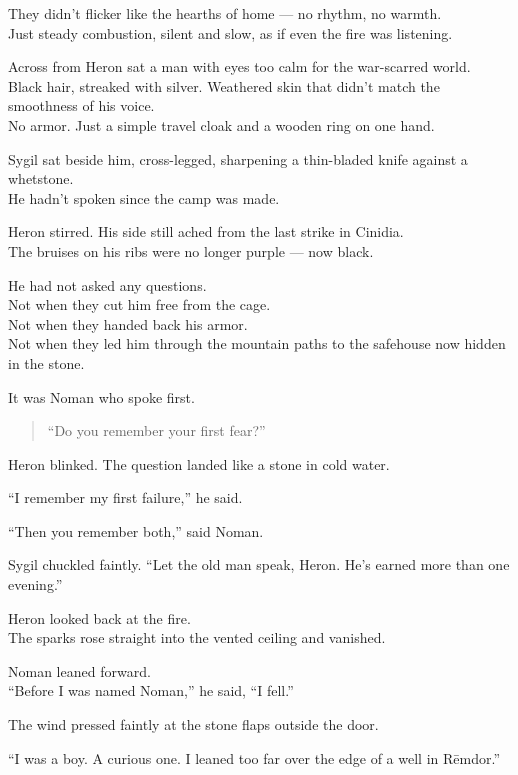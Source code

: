 \documentclass[12pt]{article}
\begin{document}
They didn’t flicker like the hearths of home — no rhythm, no warmth.\\
Just steady combustion, silent and slow, as if even the fire was listening.

Across from Heron sat a man with eyes too calm for the war-scarred world.\\
Black hair, streaked with silver. Weathered skin that didn’t match the smoothness of his voice.\\
No armor. Just a simple travel cloak and a wooden ring on one hand.

Sygil sat beside him, cross-legged, sharpening a thin-bladed knife against a whetstone.\\
He hadn’t spoken since the camp was made.

Heron stirred. His side still ached from the last strike in Cinidia.\\
The bruises on his ribs were no longer purple — now black.

He had not asked any questions.\\
Not when they cut him free from the cage.\\
Not when they handed back his armor.\\
Not when they led him through the mountain paths to the safehouse now hidden in the stone.

It was Noman who spoke first.

\begin{quote}
“Do you remember your first fear?” 
\end{quote}

Heron blinked. The question landed like a stone in cold water.

“I remember my first failure,” he said.

“Then you remember both,” said Noman.

\vspace{1em}

Sygil chuckled faintly. “Let the old man speak, Heron. He’s earned more than one evening.”

Heron looked back at the fire.\\
The sparks rose straight into the vented ceiling and vanished.

Noman leaned forward.\\
“Before I was named Noman,” he said, “I fell.”

The wind pressed faintly at the stone flaps outside the door.

“I was a boy. A curious one. I leaned too far over the edge of a well in Rēmdor.”
\end{document}
